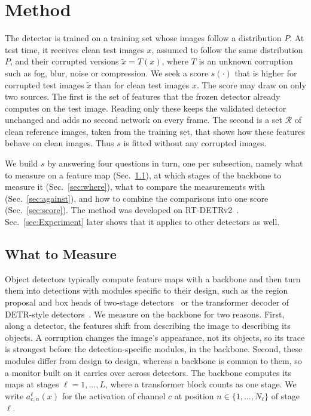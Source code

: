 \section{Method}
\label{sec:method}

The detector is trained on a training set whose images follow a distribution $P$. At test time, it receives clean test images $x$, assumed to follow the same distribution $P$, and their corrupted versions $\tilde{x} = T(x)$, where $T$ is an unknown corruption such as fog, blur, noise or compression. We seek a score $s(\cdot)$ that is higher for corrupted test images $\tilde{x}$ than for clean test images $x$. The score may draw on only two sources. The first is the set of features that the frozen detector already computes on the test image. Reading only these keeps the validated detector unchanged and adds no second network on every frame. The second is a set $\mathcal{R}$ of clean reference images, taken from the training set, that shows how these features behave on clean images. Thus $s$ is fitted without any corrupted images.

We build $s$ by answering four questions in turn, one per subsection, namely what to measure on a feature map (Sec.~\ref{sec:what}), at which stages of the backbone to measure it (Sec.~\ref{sec:where}), what to compare the measurements with (Sec.~\ref{sec:against}), and how to combine the comparisons into one score (Sec.~\ref{sec:score}). The method was developed on RT-DETRv2~\cite{lv2024rtdetrv2}. Sec.~\ref{sec:Experiment} later shows that it applies to other detectors as well.

\subsection{What to Measure}
\label{sec:what}

Object detectors typically compute feature maps with a backbone and then turn them into detections with modules specific to their design, such as the region proposal and box heads of two-stage detectors~\cite{ren2015faster,cai2018cascade} or the transformer decoder of DETR-style detectors~\cite{carion2020detr,zhao2024rtdetr}. We measure on the backbone for two reasons. First, along a detector, the features shift from describing the image to describing its objects. A corruption changes the image's appearance, not its objects, so its trace is strongest before the detection-specific modules, in the backbone. Second, these modules differ from design to design, whereas a backbone is common to them, so a monitor built on it carries over across detectors. The backbone computes its maps at stages $\ell = 1, \dots, L$, where a transformer block counts as one stage. We write $a^{\ell}_{c,n}(x)$ for the activation of channel $c$ at position $n \in \{1, \dots, N_\ell\}$ of stage $\ell$.

